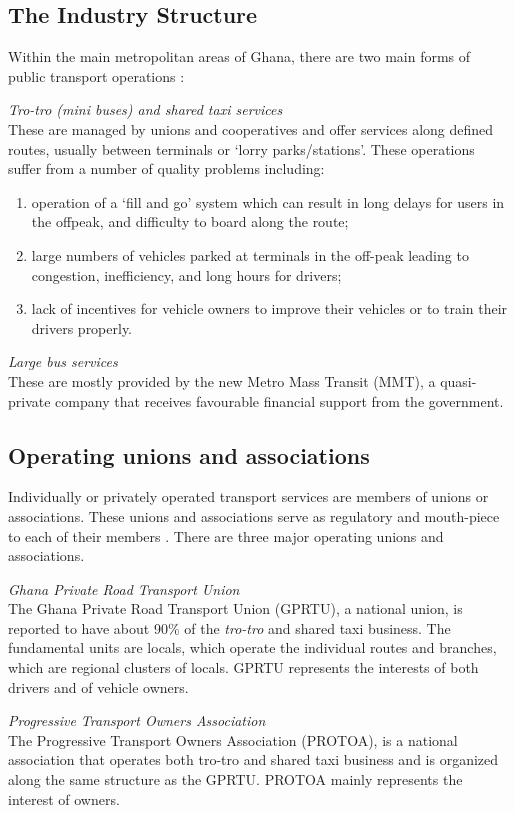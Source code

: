 \subsection{The Industry Structure}
Within the main metropolitan areas of Ghana, there are two main forms of public transport operations \citep{finn2009new}:

	\textit{\textit{Tro-tro} (mini buses) and shared taxi services}\\ 
	These are managed by unions and cooperatives and offer services along defined routes, usually between terminals or ‘lorry parks/stations’. These operations suffer from a number of quality problems including:
	\begin{enumerate}
		\item operation of a ‘fill and go’ system which can result in long delays for users in the offpeak, and difficulty to board along the route;
		\item large numbers of vehicles parked at
		terminals in the off-peak leading to congestion, inefficiency, and long hours for
		drivers; 
		\item lack of incentives for vehicle owners to improve their vehicles or to train their drivers properly.
	\end{enumerate}
\textit{Large bus services}\\
These are mostly provided by the new Metro Mass Transit (MMT), a quasi-private company that receives favourable financial support from the government.


\subsection{Operating unions and associations}
Individually or privately operated transport services are members of unions or associations. These unions and associations serve as regulatory and mouth-piece to each of their members \citep{fouracre1994public}. There are three major operating unions and associations.

\textit{Ghana Private Road Transport Union}\\
The Ghana Private Road Transport Union (GPRTU), a national union, is reported to have about 90\% of the \textit{tro-tro} and shared taxi business. The fundamental units are locals, which operate the individual routes and branches, which are regional clusters of locals. GPRTU represents the interests of both drivers and of vehicle owners.

\textit{Progressive Transport Owners Association}\\
The Progressive Transport Owners Association (PROTOA), is a national association that operates both tro-tro and shared taxi business and is organized along the same structure as the GPRTU. PROTOA mainly represents the interest of owners. 

